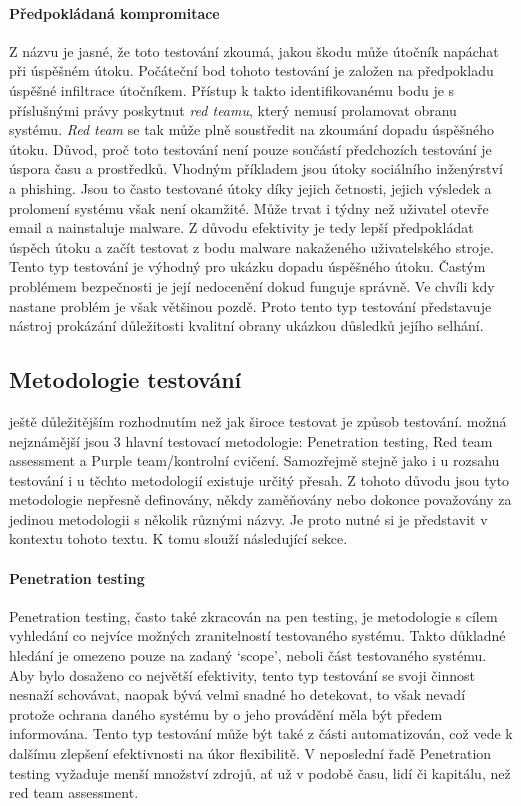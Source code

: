 \paragraph{Předpokládaná kompromitace}
Z názvu je jasné, že toto testování zkoumá, jakou škodu může útočník napáchat při úspěšném útoku.
Počáteční bod tohoto testování je založen na předpokladu úspěšné infiltrace útočníkem.
Přístup k takto identifikovanému bodu je s příslušnými právy poskytnut \textit{red teamu}, který nemusí prolamovat obranu systému.
\textit{Red team} se tak může plně soustředit na zkoumání dopadu úspěšného útoku.
Důvod, proč toto testování není pouze součástí předchozích testování je úspora času a prostředků.
Vhodným příkladem jsou útoky sociálního inženýrství a phishing.
Jsou to často testované útoky díky jejich četnosti, jejich výsledek a prolomení systému však není okamžité.
Může trvat i týdny než uživatel otevře email a nainstaluje malware.\cite{red_team_oakley_2019}
Z důvodu efektivity je tedy lepší předpokládat úspěch útoku a začít testovat z bodu malware nakaženého uživatelského stroje.
Tento typ testování je výhodný pro ukázku dopadu úspěšného útoku.
Častým problémem bezpečnosti je její nedocenění dokud funguje správně.
Ve chvíli kdy nastane problém je však většinou pozdě.
Proto tento typ testování představuje nástroj prokázání důležitosti kvalitní obrany ukázkou důsledků jejího selhání.

\subsection{Metodologie testování}%
ještě důležitějším rozhodnutím než jak široce testovat je způsob testování.
možná nejznámější jsou 3 hlavní testovací metodologie: Penetration testing, Red team assessment a Purple team/kontrolní cvičení.
Samozřejmě stejně jako i u rozsahu testování i u těchto metodologií existuje určitý přesah.
Z tohoto důvodu jsou tyto metodologie nepřesně definovány, někdy zaměňovány nebo dokonce považovány za jedinou metodologii s několik různými názvy.
Je proto nutné si je představit v kontextu tohoto textu.
K tomu slouží následující sekce.\cite{securityInteligence_pen_test_red_team_purple_team}

\paragraph{Penetration testing}

Penetration testing, často také zkracován na pen testing, je metodologie s cílem vyhledání co nejvíce možných zranitelností testovaného systému.
Takto důkladné hledání je omezeno pouze na zadaný `scope', neboli část testovaného systému.
Aby bylo dosaženo co největší efektivity, tento typ testování se svoji činnost nesnaží schovávat, naopak bývá velmi snadné ho detekovat, to však nevadí protože ochrana daného systému by o jeho provádění měla být předem informována.
Tento typ testování může být také z části automatizován, což vede k dalšímu zlepšení efektivnosti na úkor flexibilitě.
V neposlední řadě Penetration testing vyžaduje menší množství zdrojů, ať už v podobě času, lidí či kapitálu, než red team assessment.
